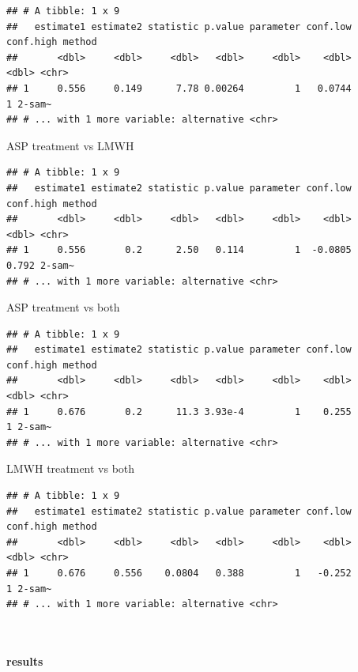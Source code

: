 \documentclass[
]{article}
\begin{document}
\begin{verbatim}
## # A tibble: 1 x 9
##   estimate1 estimate2 statistic p.value parameter conf.low conf.high method
##       <dbl>     <dbl>     <dbl>   <dbl>     <dbl>    <dbl>     <dbl> <chr> 
## 1     0.556     0.149      7.78 0.00264         1   0.0744         1 2-sam~
## # ... with 1 more variable: alternative <chr>
\end{verbatim}

ASP treatment vs LMWH

\begin{verbatim}
## # A tibble: 1 x 9
##   estimate1 estimate2 statistic p.value parameter conf.low conf.high method
##       <dbl>     <dbl>     <dbl>   <dbl>     <dbl>    <dbl>     <dbl> <chr> 
## 1     0.556       0.2      2.50   0.114         1  -0.0805     0.792 2-sam~
## # ... with 1 more variable: alternative <chr>
\end{verbatim}

ASP treatment vs both

\begin{verbatim}
## # A tibble: 1 x 9
##   estimate1 estimate2 statistic p.value parameter conf.low conf.high method
##       <dbl>     <dbl>     <dbl>   <dbl>     <dbl>    <dbl>     <dbl> <chr> 
## 1     0.676       0.2      11.3 3.93e-4         1    0.255         1 2-sam~
## # ... with 1 more variable: alternative <chr>
\end{verbatim}

LMWH treatment vs both

\begin{verbatim}
## # A tibble: 1 x 9
##   estimate1 estimate2 statistic p.value parameter conf.low conf.high method
##       <dbl>     <dbl>     <dbl>   <dbl>     <dbl>    <dbl>     <dbl> <chr> 
## 1     0.676     0.556    0.0804   0.388         1   -0.252         1 2-sam~
## # ... with 1 more variable: alternative <chr>
\end{verbatim}

~\\

\hypertarget{results}{%
\paragraph{results}\label{results}}
\end{document}
